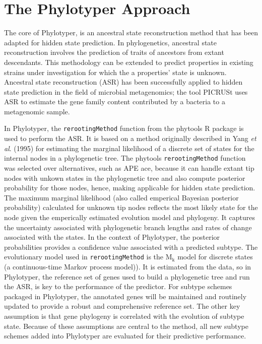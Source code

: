\documentclass{bioinfo}
\begin{document}
\section{The Phylotyper Approach}

The core of Phylotyper, is an ancestral state reconstruction method that has been adapted for hidden state prediction.
In phylogenetics, ancestral state reconstruction involves the prediction of traits of ancestors from extant descendants.
This methodology can be extended to predict properties in existing strains under investigation for which the a properties' state is unknown.
Ancestral state reconstruction (ASR) has been successfully applied to hidden state prediction in the field of microbial metagenomics; the tool PICRUSt uses ASR to estimate the gene family content contributed by a bacteria to a metagenomic sample.

In Phylotyper, the \texttt{rerootingMethod} function from the phytools R package is used to perform the ASR.
It is based on a method originally described in Yang \emph{et al}. (1995) for estimating the marginal likelihood of a discrete set of states for the internal nodes in a phylogenetic tree.
The phytools \texttt{rerootingMethod} function was selected over alternatives, such as APE ace, because it can handle extant tip nodes with unkown states in the phylogenetic tree and also compute posterior probability for those nodes, hence, making applicable for hidden state prediction.
The maximum marginal likelihood (also called emperical Bayesian posterior probability) calculated for unknown tip nodes reflects the most likely state for the node given the emperically estimated evolution model and phylogeny.
It captures the uncertainty associated with phylogenetic branch lengths and rates of change associated with the states.
In the context of Phylotyper, the posterior probabilities provides a confidence value associated with a predicted subtype.
The evolutionary model used in \texttt{rerootingMethod} is the $\text{M}_{\text{k}}$ model for discrete states (a continuous-time Markov process model)).  
It is estimated from the data, so in Phylotyper, the reference set of genes used to build a phylogenetic tree and run the ASR, is key to the performance of the predictor.
For subtype schemes packaged in Phylotyper, the annotated genes will be maintained and routinely updated to provide a robust and comprehensive reference set.
The other key assumption is that gene phylogeny is correlated with the evolution of subtype state.
Because of these assumptions are central to the method, all new subtype schemes added into Phylotyper are evaluated for their predictive performance.
\end{document}
